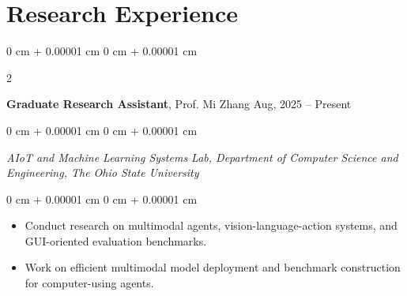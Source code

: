 \documentclass[10pt, letterpaper]{article}
\newenvironment{highlights}{
    \begin{itemize}[
        topsep=0.10 cm,
        parsep=0.10 cm,
        partopsep=0pt,
        itemsep=0pt,
        leftmargin=0 cm + 10pt
    ]
}{
    \end{itemize}
} %
\newenvironment{onecolentry}{
    \begin{adjustwidth}{
        0 cm + 0.00001 cm
    }{
        0 cm + 0.00001 cm
    }
}{
    \end{adjustwidth}
} %
\newenvironment{twocolentry}[2][]{
    \onecolentry
    \def\secondColumn{#2}
    \setcolumnwidth{\fill, 6.5 cm}
    \begin{paracol}{2}
}{
    \switchcolumn \raggedleft \secondColumn
    \end{paracol}
    \endonecolentry
} %
\begin{document}
        \vspace{0.20 cm}
   


    \section{Research Experience}

        \begin{twocolentry}{
            Aug, 2025 – Present
        }
            \textbf{Graduate Research Assistant}, Prof. Mi Zhang\end{twocolentry}

        \begin{onecolentry}
            \textit{AIoT and Machine Learning Systems Lab, Department of Computer Science and Engineering, The Ohio State University}
        \end{onecolentry}

        \vspace{0.10 cm}

        \begin{onecolentry}
            \begin{highlights}
                \item Conduct research on multimodal agents, vision-language-action systems, and GUI-oriented evaluation benchmarks.
                \item Work on efficient multimodal model deployment and benchmark construction for computer-using agents.
            \end{highlights}
        \end{onecolentry}
    
\end{document}
